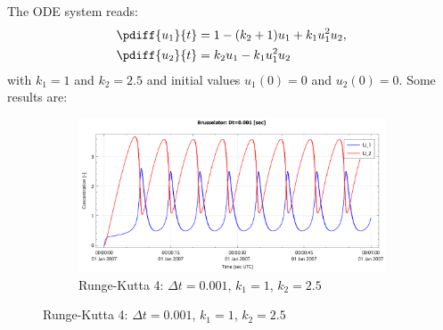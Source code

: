 \documentclass{mooiman_memo}
\newcommand{\Dt}{\Delta t}
\begin{document}
The  ODE system reads:
\begin{align}
    \pdiff{u_1}{t} & = 1 - (k_2 + 1) u_1 + k_1 u_1^2 u_2,
    \\
    \pdiff{u_2}{t} & = k_2 u_1 - k_1 u_1^2 u_2
\end{align}
with $k_1 =1$ and  $k_2 = 2.5$ and initial values  $u_1(0)=0$ and $u_2(0) = 0$.
%
%
%
Some results are:
\begin{figure}[H]
    \begin{subfigure}{\textwidth}
        \includegraphics[width=\textwidth]{figures/brusselator_rk4_dt=0d001.pdf}
        \caption{Runge-Kutta 4: $\Dt=0.001$, $k_1=1$, $k_2=2.5$}
    \end{subfigure}
\end{figure}
\end{document}
